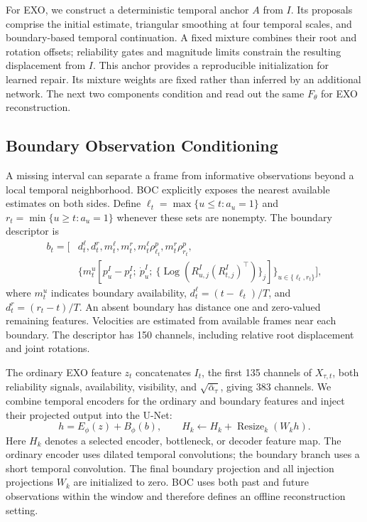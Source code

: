 For EXO, we construct a deterministic temporal anchor $A$ from $I$. Its proposals comprise the initial estimate, triangular smoothing at four temporal scales, and boundary-based temporal continuation. A fixed mixture combines their root and rotation offsets; reliability gates and magnitude limits constrain the resulting displacement from $I$. This anchor provides a reproducible initialization for learned repair. Its mixture weights are fixed rather than inferred by an additional network. The next two components condition and read out the same $F_\theta$ for EXO reconstruction.

\subsection{Boundary Observation Conditioning}
\label{sec:boc}

A missing interval can separate a frame from informative observations beyond a local temporal neighborhood. BOC explicitly exposes the nearest available estimates on both sides. Define $\ell_t=\max\{u\leq t:a_u=1\}$ and $r_t=\min\{u\geq t:a_u=1\}$ whenever these sets are nonempty. The boundary descriptor is
\begin{equation}
\begin{aligned}
b_t=\big[&
d^\ell_t,d^r_t,m^\ell_t,m^r_t,
m^\ell_t\rho^p_{\ell_t},m^r_t\rho^p_{r_t},\\
&\{m^u_t[
p^I_u-p^I_t;\ \dot p^I_u;\
\{\operatorname{Log}(R^I_{u,j}(R^I_{t,j})^\top)\}_{j}]
\}_{u\in\{\ell_t,r_t\}}\big],
\end{aligned}
\label{eq:boundary}
\end{equation}
where $m^u_t$ indicates boundary availability, $d^\ell_t=(t-\ell_t)/T$, and $d^r_t=(r_t-t)/T$. An absent boundary has distance one and zero-valued remaining features. Velocities are estimated from available frames near each boundary. The descriptor has 150 channels, including relative root displacement and joint rotations.

The ordinary EXO feature $z_t$ concatenates $I_t$, the first 135 channels of $X_{\tau,t}$, both reliability signals, availability, visibility, and $\sqrt{\bar\alpha_\tau}$, giving 383 channels. We combine temporal encoders for the ordinary and boundary features and inject their projected output into the U-Net:
\begin{equation}
h=E_\phi(z)+B_\phi(b),\qquad
H_k\leftarrow H_k+
\operatorname{Resize}_k(W_k h).
\label{eq:injection}
\end{equation}
Here $H_k$ denotes a selected encoder, bottleneck, or decoder feature map. The ordinary encoder uses dilated temporal convolutions; the boundary branch uses a short temporal convolution. The final boundary projection and all injection projections $W_k$ are initialized to zero. BOC uses both past and future observations within the window and therefore defines an offline reconstruction setting.

